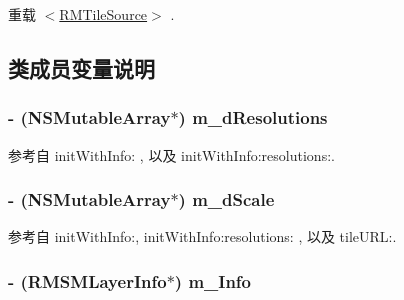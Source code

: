 重载 \hyperlink{protocol_r_m_tile_source-p_a1838a34e9341efe7c76252e131824261}{$<$\-R\-M\-Tile\-Source$>$} .



\subsection{类成员变量说明}
\hypertarget{interface_r_m_s_m_tile_source_a68bd5cd0a6b8a8161ca0b9dceee8eb17}{
\subsubsection[{m\-\_\-d\-Resolutions}]{\setlength{\rightskip}{0pt plus 5cm}-\/ (N\-S\-Mutable\-Array$\ast$) m\-\_\-d\-Resolutions\hspace{0.3cm}{\ttfamily [protected]}}}\label{interface_r_m_s_m_tile_source_a68bd5cd0a6b8a8161ca0b9dceee8eb17}


参考自 init\-With\-Info\-: , 以及 init\-With\-Info\-:resolutions\-:.

\hypertarget{interface_r_m_s_m_tile_source_a6587840e4cce389c96e06aeceac54903}{
\subsubsection[{m\-\_\-d\-Scale}]{\setlength{\rightskip}{0pt plus 5cm}-\/ (N\-S\-Mutable\-Array$\ast$) m\-\_\-d\-Scale\hspace{0.3cm}{\ttfamily [protected]}}}\label{interface_r_m_s_m_tile_source_a6587840e4cce389c96e06aeceac54903}


参考自 init\-With\-Info\-:, init\-With\-Info\-:resolutions\-: , 以及 tile\-U\-R\-L\-:.

\hypertarget{interface_r_m_s_m_tile_source_a4af8afb20d814e6560a7ad5f06842121}{
\subsubsection[{m\-\_\-\-Info}]{\setlength{\rightskip}{0pt plus 5cm}-\/ ({\bf R\-M\-S\-M\-Layer\-Info}$\ast$) m\-\_\-\-Info\hspace{0.3cm}{\ttfamily [protected]}}}\label{interface_r_m_s_m_tile_source_a4af8afb20d814e6560a7ad5f06842121}


